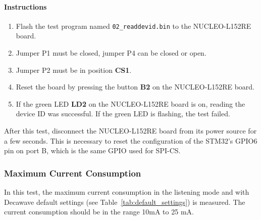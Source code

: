\documentclass[journal,comsoc]{IEEEtran}
\begin{document}
\paragraph{Instructions}
\begin{enumerate}
	\item Flash the test program named \texttt{02\_readdevid.bin} to the NUCLEO-L152RE board.
	\item Jumper P1 must be closed, jumper P4 can be closed or open.
	\item Jumper P2 must be in position \textbf{CS1}.
	\item Reset the board by pressing the button \textbf{B2} on the NUCLEO-L152RE board.
	\item If the green LED \textbf{LD2} on the NUCLEO-L152RE board is on, reading the device ID was successful. If the green LED is flashing, the test failed.
\end{enumerate}
After this test, disconnect the NUCLEO-L152RE board from its power source for a few seconds.
This is necessary to reset the configuration of the STM32's GPIO6 pin on port B, which is the same GPIO used for SPI-CS.

\vspace*{1em}
\subsubsection{Maximum Current Consumption}
In this test, the maximum current consumption in the listening mode and with Decawave default settings (see Table~\ref{tab:default_settings}) is measured. The current consumption should be in the range 10mA to 25 mA.
\end{document}
